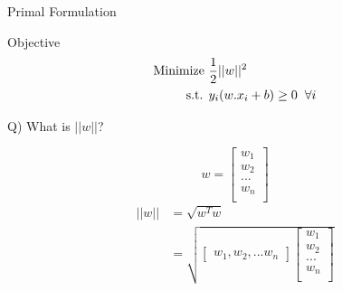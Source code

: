 \documentclass{beamer}
\begin{document}
\begin{frame}{Primal Formulation}
	\begin{tcolorbox}{Objective}
	\begin{align*}
	\text{Minimize } & \frac{1}{2}||w||^{2} \\
	\text{s.t. } & y_{i}(w.x_{i} + b) \geq 0 \hspace{2mm}\forall i
	\end{align*}
\end{tcolorbox}
\pause 
Q) What is $||w||$?
\pause
\begin{multicols}{2}
\begin{equation*}
	 w = \begin{bmatrix}
	 w_{1} \\
     w_{2} \\
     ...  \\
     w_{n} \\
	\end{bmatrix}
\end{equation*}\break
\begin{align*}
	 ||w|| &= \sqrt{w^{T}w}\\
	 &= \sqrt{\begin{bmatrix}
	 w_{1}, w_{2}, ... w_{n}
	 \end{bmatrix}
	 \begin{bmatrix}
	  w_{1} \\
	  w_{2} \\
     ...  \\
     w_{n} \\
	 \end{bmatrix}}
\end{align*}

\end{multicols}

\end{frame}
\end{document}
